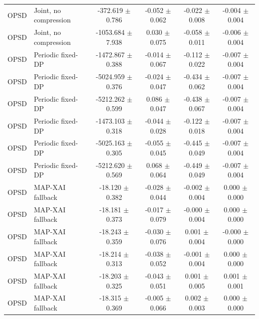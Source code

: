 \begin{tabular}{llcccc}
OPSD & Joint, no compression & -372.619 $\pm$ 0.786 & -0.052 $\pm$ 0.062 & -0.022 $\pm$ 0.008 & -0.004 $\pm$ 0.004 \\
OPSD & Joint, no compression & -1053.684 $\pm$ 7.938 & 0.030 $\pm$ 0.075 & -0.058 $\pm$ 0.011 & -0.006 $\pm$ 0.004 \\
OPSD & Periodic fixed-DP & -1472.867 $\pm$ 0.388 & -0.014 $\pm$ 0.067 & -0.112 $\pm$ 0.022 & -0.007 $\pm$ 0.004 \\
OPSD & Periodic fixed-DP & -5024.959 $\pm$ 0.376 & -0.024 $\pm$ 0.047 & -0.434 $\pm$ 0.062 & -0.007 $\pm$ 0.004 \\
OPSD & Periodic fixed-DP & -5212.262 $\pm$ 0.599 & 0.086 $\pm$ 0.047 & -0.438 $\pm$ 0.067 & -0.007 $\pm$ 0.004 \\
OPSD & Periodic fixed-DP & -1473.103 $\pm$ 0.318 & -0.044 $\pm$ 0.028 & -0.122 $\pm$ 0.018 & -0.007 $\pm$ 0.004 \\
OPSD & Periodic fixed-DP & -5025.163 $\pm$ 0.305 & -0.055 $\pm$ 0.045 & -0.445 $\pm$ 0.049 & -0.007 $\pm$ 0.004 \\
OPSD & Periodic fixed-DP & -5212.620 $\pm$ 0.569 & 0.068 $\pm$ 0.064 & -0.449 $\pm$ 0.049 & -0.007 $\pm$ 0.004 \\
OPSD & MAP-XAI fallback & -18.120 $\pm$ 0.382 & -0.028 $\pm$ 0.044 & -0.002 $\pm$ 0.004 & 0.000 $\pm$ 0.000 \\
OPSD & MAP-XAI fallback & -18.181 $\pm$ 0.373 & -0.017 $\pm$ 0.079 & -0.000 $\pm$ 0.004 & 0.000 $\pm$ 0.000 \\
OPSD & MAP-XAI fallback & -18.243 $\pm$ 0.359 & -0.030 $\pm$ 0.076 & 0.001 $\pm$ 0.004 & -0.000 $\pm$ 0.000 \\
OPSD & MAP-XAI fallback & -18.214 $\pm$ 0.313 & -0.038 $\pm$ 0.052 & -0.001 $\pm$ 0.004 & 0.000 $\pm$ 0.000 \\
OPSD & MAP-XAI fallback & -18.203 $\pm$ 0.325 & -0.043 $\pm$ 0.051 & 0.001 $\pm$ 0.005 & 0.001 $\pm$ 0.001 \\
OPSD & MAP-XAI fallback & -18.315 $\pm$ 0.369 & -0.005 $\pm$ 0.066 & 0.002 $\pm$ 0.003 & 0.000 $\pm$ 0.000 \\
\bottomrule
\end{tabular}
